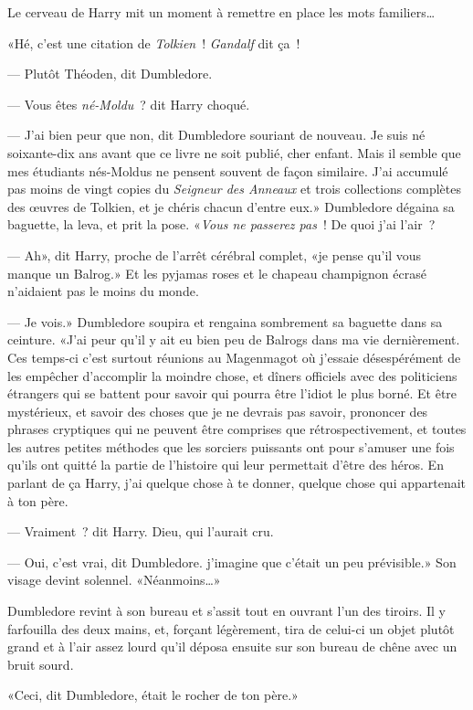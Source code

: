 Le cerveau de Harry mit un moment à remettre en place les mots familiers…

«Hé, c'est une citation de \emph{Tolkien}~! \emph{Gandalf} dit ça~!

--- Plutôt Théoden, dit Dumbledore.

--- Vous êtes \emph{né-Moldu}~? dit Harry choqué.

--- J'ai bien peur que non, dit Dumbledore souriant de nouveau. Je suis né soixante-dix ans avant que ce livre ne soit publié, cher enfant. Mais il semble que mes étudiants nés-Moldus ne pensent souvent de façon similaire. J'ai accumulé pas moins de vingt copies du \emph{Seigneur des Anneaux} et trois collections complètes des œuvres de Tolkien, et je chéris chacun d'entre eux.» Dumbledore dégaina sa baguette, la leva, et prit la pose. «\emph{Vous ne passerez pas}~! De quoi j'ai l'air~?

--- Ah», dit Harry, proche de l'arrêt cérébral complet, «je pense qu'il vous manque un Balrog.» Et les pyjamas roses et le chapeau champignon écrasé n'aidaient pas le moins du monde.

--- Je vois.» Dumbledore soupira et rengaina sombrement sa baguette dans sa ceinture. «J'ai peur qu'il y ait eu bien peu de Balrogs dans ma vie dernièrement. Ces temps-ci c'est surtout réunions au Magenmagot où j'essaie désespérément de les empêcher d'accomplir la moindre chose, et dîners officiels avec des politiciens étrangers qui se battent pour savoir qui pourra être l'idiot le plus borné. Et être mystérieux, et savoir des choses que je ne devrais pas savoir, prononcer des phrases cryptiques qui ne peuvent être comprises que rétrospectivement, et toutes les autres petites méthodes que les sorciers puissants ont pour s'amuser une fois qu'ils ont quitté la partie de l'histoire qui leur permettait d'être des héros. En parlant de ça Harry, j'ai quelque chose à te donner, quelque chose qui appartenait à ton père.

--- Vraiment~? dit Harry. Dieu, qui l'aurait cru.

--- Oui, c'est vrai, dit Dumbledore. j'imagine que c'était un peu prévisible.» Son visage devint solennel. «Néanmoins…»

Dumbledore revint à son bureau et s'assit tout en ouvrant l'un des tiroirs. Il y farfouilla des deux mains, et, forçant légèrement, tira de celui-ci un objet plutôt grand et à l'air assez lourd qu'il déposa ensuite sur son bureau de chêne avec un bruit sourd.

«Ceci, dit Dumbledore, était le rocher de ton père.»

